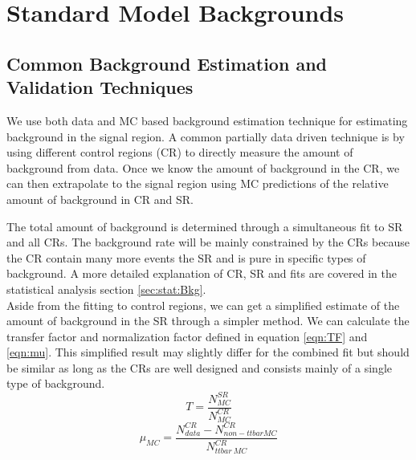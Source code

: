 \chapter{Standard Model Backgrounds}
\label{chap:backgrounds}

\section{Common Background Estimation and Validation Techniques}
\label{sec:Bkg:Tech}

\indent We use both data and MC based background estimation technique for estimating background in the signal region.  A common partially data driven technique is by using different control regions (CR) to directly measure the amount of background from data.  Once we know the amount of background in the CR, we can then extrapolate to the signal region using MC predictions of the relative amount of background in CR and SR. 

\indent The total amount of background is determined through a simultaneous fit to SR and all CRs.  The background rate will be mainly constrained by the CRs because the CR contain many more events the SR and is pure in specific types of background.  A more detailed explanation of CR, SR and fits are covered in the statistical analysis section \ref{sec:stat:Bkg}.  \\

\indent Aside from the fitting to control regions, we can get a simplified estimate of the amount of background in the SR through a simpler method.  We can calculate the transfer factor and normalization factor defined in equation \ref{eqn:TF} and \ref{eqn:mu}. This simplified result may slightly differ for the combined fit but should be similar as long as the CRs are well designed and consists mainly of a single type of background. \\

\begin{equation}
T = \frac{N_{MC}^{SR}}{N_{MC}^{CR}}
\label{eqn:TF}
\end{equation}
\begin{equation}
\mu_{MC} = \frac{N_{data}^{CR}-N_{non-ttbar MC}^{CR}}{N_{ttbar~MC}^{CR}}
\label{eqn:mu}
\end{equation}

